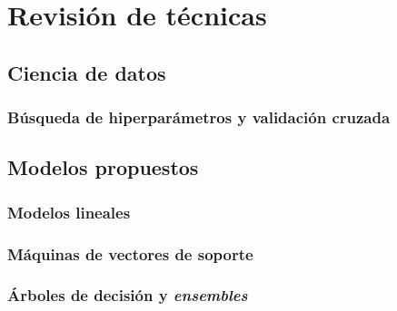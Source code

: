 \chapter{Revisión de técnicas}

\section{Ciencia de datos}

\subsection{Búsqueda de hiperparámetros y validación cruzada}

\section{Modelos propuestos}

\subsection{Modelos lineales}

\subsection{Máquinas de vectores de soporte}

\subsection{Árboles de decisión y \textit{ensembles}}